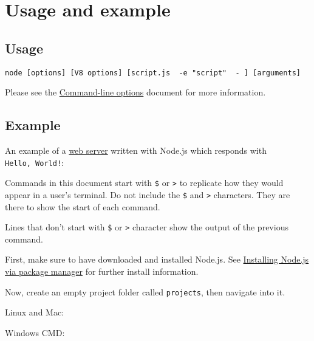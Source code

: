 \section{Usage and example}\label{usage-and-example}

\subsection{Usage}\label{usage}

\texttt{node\ {[}options{]}\ {[}V8\ options{]}\ {[}script.js\ \textbar{}\ -e\ "script"\ \textbar{}\ -\ {]}\ {[}arguments{]}}

Please see the \href{cli.md\#options}{Command-line options} document for
more information.

\subsection{Example}\label{example}

An example of a \href{http.md}{web server} written with Node.js which
responds with
\texttt{\textquotesingle{}Hello,\ World!\textquotesingle{}}:

Commands in this document start with \texttt{\$} or
\texttt{\textgreater{}} to replicate how they would appear in a user's
terminal. Do not include the \texttt{\$} and \texttt{\textgreater{}}
characters. They are there to show the start of each command.

Lines that don't start with \texttt{\$} or \texttt{\textgreater{}}
character show the output of the previous command.

First, make sure to have downloaded and installed Node.js. See
\href{https://nodejs.org/en/download/package-manager/}{Installing
Node.js via package manager} for further install information.

Now, create an empty project folder called \texttt{projects}, then
navigate into it.

Linux and Mac:

\begin{Shaded}
\begin{Highlighting}[]
\end{Highlighting}
\end{Shaded}

Windows CMD:

\begin{Shaded}
\begin{Highlighting}[]
\OperatorTok{\%}\OperatorTok{\%}
 \OperatorTok{\%}\OperatorTok{\%}
\end{Highlighting}
\end{Shaded}

